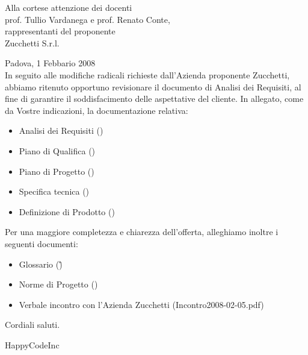 


\newcommand{\dt}{ Lettera di accompagnamento }%




\thispagestyle{plain}
\begin{flushright}
Alla cortese attenzione dei docenti\\
prof. Tullio Vardanega e prof. Renato Conte,\\
rappresentanti del proponente\\
Zucchetti S.r.l.
\end{flushright}
Padova, 1 Febbario 2008 \\

In seguito alle modifiche radicali richieste dall'Azienda proponente Zucchetti, abbiamo ritenuto opportuno revisionare il documento di Analisi dei Requisiti, al fine di garantire il soddisfacimento delle aspettative del cliente. \newline
In allegato, come da Vostre indicazioni, la documentazione relativa:
\begin{itemize}
\item{}Analisi dei Requisiti (\AR)
\item{}Piano di Qualifica (\PdQ)
\item{}Piano di Progetto (\PdP)
\item{}Specifica tecnica (\ST) 
\item{}Definizione di Prodotto (\DdP)
\end{itemize}
Per una maggiore completezza e chiarezza dell'offerta, alleghiamo inoltre i seguenti documenti:
\begin{itemize}
\item{}Glossario (\G)
\item{}Norme di Progetto (\NdP)
\item{}Verbale incontro con l'Azienda Zucchetti (Incontro2008-02-05.pdf)
\end{itemize}
Cordiali saluti.
\begin{flushright}
HappyCodeInc
\end{flushright}
\newpage


